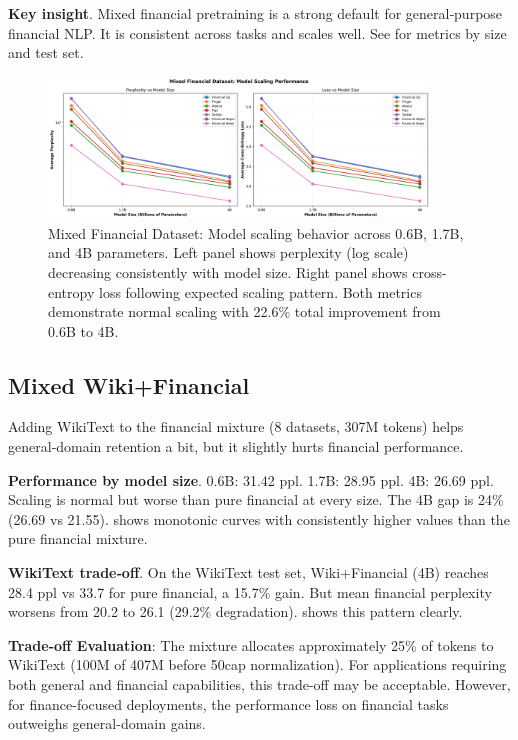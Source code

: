 \textbf{Key insight}. Mixed financial pretraining is a strong default for general‑purpose financial NLP. It is consistent across tasks and scales well. See  for metrics by size and test set.

\begin{figure}[h]
\centering
\includegraphics[width=0.9\textwidth]{figures/scaling_mixed_financial.png}
\caption[Mixed Financial Dataset: Scaling Behavior]{Mixed Financial Dataset: Model scaling behavior across 0.6B, 1.7B, and 4B parameters. Left panel shows perplexity (log scale) decreasing consistently with model size. Right panel shows cross-entropy loss following expected scaling pattern. Both metrics demonstrate normal scaling with 22.6\% total improvement from 0.6B to 4B.}
\label{fig:scaling_mixed_financial}
\end{figure}



\subsection{Mixed Wiki+Financial}

Adding WikiText to the financial mixture (8 datasets, 307M tokens) helps general‑domain retention a bit, but it slightly hurts financial performance.

\textbf{Performance by model size}. 0.6B: 31.42 ppl. 1.7B: 28.95 ppl. 4B: 26.69 ppl. Scaling is normal but worse than pure financial at every size. The 4B gap is 24\% (26.69 vs 21.55).  shows monotonic curves with consistently higher values than the pure financial mixture.

\textbf{WikiText trade‑off}. On the WikiText test set, Wiki+Financial (4B) reaches 28.4 ppl vs 33.7 for pure financial, a 15.7\% gain. But mean financial perplexity worsens from 20.2 to 26.1 (29.2\% degradation).  shows this pattern clearly.

\textbf{Trade-off Evaluation}: The mixture allocates approximately 25\% of tokens to WikiText (100M of 407M before 50cap normalization). For applications requiring both general and financial capabilities, this trade-off may be acceptable. However, for finance-focused deployments, the performance loss on financial tasks outweighs general-domain gains.

